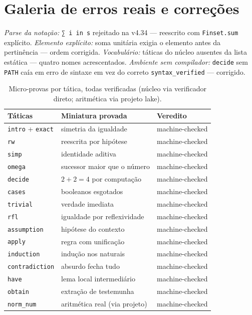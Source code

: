 \section{Galeria de erros reais e correções}
\textit{Parse da notação:} \texttt{∑ i in s} rejeitado na v4.34 --- reescrito com \texttt{Finset.sum} explícito. \textit{Elemento explícito:} soma unitária exigia o elemento antes da pertinência --- ordem corrigida. \textit{Vocabulário:} táticas do núcleo ausentes da lista estática --- quatro nomes acrescentados. \textit{Ambiente sem compilador:} \texttt{decide} sem \texttt{PATH} caía em erro de sintaxe em vez do correto \texttt{syntax\_verified} --- corrigido.
\begin{table}[h]
\centering
\caption{Micro-provas por tática, todas verificadas (núcleo via verificador direto; aritmética via projeto lake).}
\label{tab:microprovas}
\begin{tabular}{lll}
\toprule
Táticas & Miniatura provada & Veredito \\
\midrule
\texttt{intro} + \texttt{exact} & simetria da igualdade & machine-checked \\
\texttt{rw} & reescrita por hipótese & machine-checked \\
\texttt{simp} & identidade aditiva & machine-checked \\
\texttt{omega} & sucessor maior que o número & machine-checked \\
\texttt{decide} & $2+2=4$ por computação & machine-checked \\
\texttt{cases} & booleanos esgotados & machine-checked \\
\texttt{trivial} & verdade imediata & machine-checked \\
\texttt{rfl} & igualdade por reflexividade & machine-checked \\
\texttt{assumption} & hipótese do contexto & machine-checked \\
\texttt{apply} & regra com unificação & machine-checked \\
\texttt{induction} & indução nos naturais & machine-checked \\
\texttt{contradiction} & absurdo fecha tudo & machine-checked \\
\texttt{have} & lema local intermediário & machine-checked \\
\texttt{obtain} & extração de testemunha & machine-checked \\
\texttt{norm\_num} & aritmética real (via projeto) & machine-checked \\
\bottomrule
\end{tabular}
\end{table}
